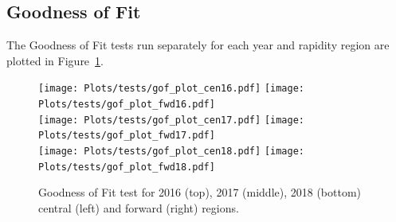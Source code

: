    
   
   
\subsection{Goodness of Fit}
\label{sec:appendix_gof}


The Goodness of Fit tests run separately for each year and rapidity region are plotted in Figure~\ref{fig:gof}.

         
\begin{figure}[!htbp]
                \begin{center}
                 \texttt{[image: Plots/tests/gof\_plot\_cen16.pdf]}
		\texttt{[image: Plots/tests/gof\_plot\_fwd16.pdf]} \\
                 \texttt{[image: Plots/tests/gof\_plot\_cen17.pdf]} 
                 \texttt{[image: Plots/tests/gof\_plot\_fwd17.pdf]} \\
		\texttt{[image: Plots/tests/gof\_plot\_cen18.pdf]}
                 \texttt{[image: Plots/tests/gof\_plot\_fwd18.pdf]}

                    \caption{Goodness of Fit test for 2016 (top), 2017 (middle), 2018 (bottom) central (left) and forward (right) regions.}
                    \label{fig:gof}
                \end{center}
            \end{figure}
